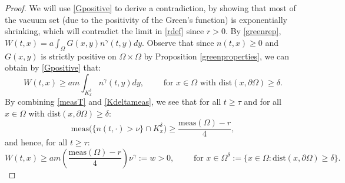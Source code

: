 \documentclass[12pt]{article}
\theoremstyle{plain}
\begin{document}
\begin{proof}
We will use \eqref{Gpositive} to derive a contradiction, by showing that most of the vacuum set (due to the positivity of the Green's function) is exponentially shrinking, which will contradict the limit in \eqref{rdef} since $r > 0$. By \eqref{greenrep}, $\displaystyle
W(t, x) = a\int_{\Omega} G(x, y) n^{\gamma}(t, y) dy$. Observe that since $n(t, x) \ge 0$ and $G(x, y)$ is strictly positive on $\Omega \times \Omega$ by Proposition \ref{greenproperties}, we can obtain by \eqref{Gpositive} that:
\begin{equation*}
W(t, x) \ge am\int_{K_{x}^{\delta}} n^{\gamma}(t, y) dy, \qquad \text{ for } x \in \Omega \text{ with } \text{dist}(x, \partial \Omega) \ge \delta.
\end{equation*}
By combining \eqref{measT} and \eqref{Kdeltameas}, we see that for all $t \ge \tau$ and for all $x \in \Omega$ with $\text{dist}(x, \partial \Omega) \ge \delta$:
\begin{equation*}
\text{meas}\Big(\{n(t, \cdot) > \nu\} \cap K^{\delta}_{x}\Big) \ge \frac{\text{meas}(\Omega) - r}{4},
\end{equation*}
and hence, for all $t \ge \tau$:
\begin{equation*}
W(t, x) \ge am\left(\frac{\text{meas}(\Omega) - r}{4}\right) \nu^{\gamma} := w > 0, \qquad \text{ for } x \in \Omega^{\delta} := \{x \in \Omega: \text{dist}(x, \partial \Omega) \ge \delta\}.
\end{equation*}


\end{proof}
\end{document}
